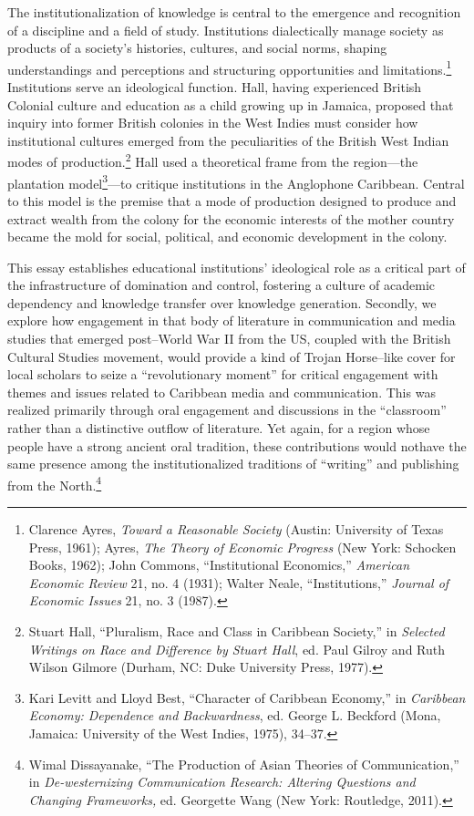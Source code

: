 \documentclass{tufte-handout}
\begin{document}
The institutionalization of knowledge is central to the emergence and
recognition of a discipline and a field of study. Institutions
dialectically manage society as products of a society's histories,
cultures, and social norms, shaping understandings and perceptions and
structuring opportunities and limitations.\footnote{Clarence Ayres,
  \emph{Toward a Reasonable Society} (Austin: University of Texas Press,
  1961); Ayres, \emph{The Theory of Economic Progress} (New York:
  Schocken Books, 1962); John Commons, ``Institutional Economics,''
  \emph{American Economic Review} 21, no. 4 (1931); Walter Neale,
  ``Institutions,'' \emph{Journal of Economic Issues} 21, no. 3 (1987).}
Institutions serve an ideological function. Hall, having experienced
British Colonial culture and education as a child growing up in Jamaica,
proposed that inquiry into former British colonies in the West Indies
must consider how institutional cultures emerged from the peculiarities
of the British West Indian modes of production.\footnote{Stuart Hall,
  ``Pluralism, Race and Class in Caribbean Society,'' in \emph{Selected
  Writings on Race and Difference by Stuart Hall}, ed. Paul Gilroy and
  Ruth Wilson Gilmore (Durham, NC: Duke University Press, 1977).} Hall
used a theoretical frame from the region---the plantation
model\footnote{Kari Levitt and Lloyd Best, ``Character of Caribbean
  Economy,'' in \emph{Caribbean Economy: Dependence and Backwardness},
  ed. George L. Beckford (Mona, Jamaica: University of the West Indies,
  1975), 34--37.}---to critique institutions in the Anglophone
Caribbean. Central to this model is the premise that a mode of
production designed to produce and extract wealth from the colony for
the economic interests of the mother country became the mold for social,
political, and economic development in the colony.

This essay establishes educational institutions' ideological role as a
critical part of the infrastructure of domination and control, fostering
a culture of academic dependency and knowledge transfer over knowledge
generation. Secondly, we explore how engagement in that body of
literature in communication and media studies that emerged post--World
War II from the US, coupled with the British Cultural Studies movement,
would provide a kind of Trojan Horse--like cover for local scholars to
seize a ``revolutionary moment'' for critical engagement with themes and
issues related to Caribbean media and communication. This was realized
primarily through oral engagement and discussions in the ``classroom''
rather than a distinctive outflow of literature. Yet again, for a region
whose people have a strong ancient oral tradition, these contributions
would not\newpage\noindent have the same presence among the institutionalized traditions
of ``writing'' and publishing from the North.\footnote{Wimal
  Dissayanake, ``The Production of Asian Theories of Communication,'' in
  \emph{De-westernizing Communication Research: Altering Questions and
  Changing Frameworks,} ed. Georgette Wang (New York: Routledge, 2011).}
\end{document}
